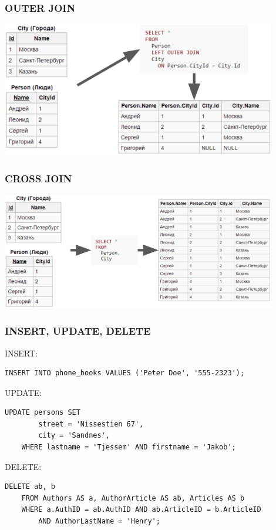 \documentclass{../../slides-style}
\begin{document}
    \begin{frame}
        \frametitle{OUTER JOIN}
        \begin{center}
            \includegraphics[width=0.9\textwidth]{outerJoin.png}
        \end{center}
    \end{frame}

    \begin{frame}
        \frametitle{CROSS JOIN}
        \begin{center}
            \includegraphics[width=0.9\textwidth]{crossJoin.png}
        \end{center}
    \end{frame}

    \begin{frame}[fragile]
        \frametitle{INSERT, UPDATE, DELETE}
        \begin{small}
            INSERT:
            \begin{verbatim}
INSERT INTO phone_books VALUES ('Peter Doe', '555-2323');
            \end{verbatim}

            \vspace{3mm}
            UPDATE:
            \begin{verbatim}
UPDATE persons SET
        street = 'Nissestien 67',
        city = 'Sandnes',
    WHERE lastname = 'Tjessem' AND firstname = 'Jakob';
            \end{verbatim}

            \vspace{3mm}
            DELETE:
            \begin{verbatim}
DELETE ab, b
    FROM Authors AS a, AuthorArticle AS ab, Articles AS b
    WHERE a.AuthID = ab.AuthID AND ab.ArticleID = b.ArticleID
        AND AuthorLastName = 'Henry';
            \end{verbatim}
        \end{small}
    \end{frame}
\end{document}
